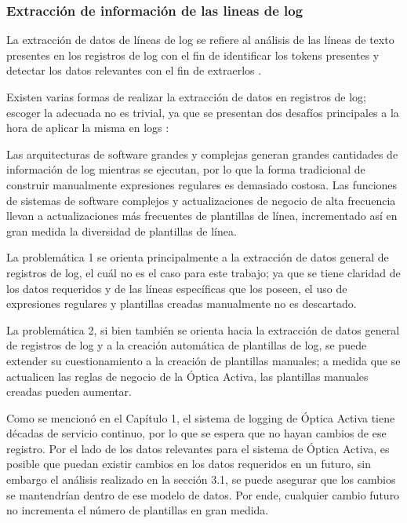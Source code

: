 \begin{enumerate}
\subsubsection{Extracción de información de las lineas de log}

La extracción de datos de líneas de log se refiere al análisis de las líneas de texto presentes en los registros de log con el fin de identificar los tokens presentes y detectar los datos relevantes con el fin de extraerlos \cite{jayathilake2011mind}. 

Existen varias formas de realizar la extracción de datos en registros de log; escoger la adecuada no es trivial, ya que se presentan dos desafíos principales a la hora de aplicar la misma en logs \cite{jayathilake2011mind}:

Las arquitecturas de software grandes y complejas generan grandes cantidades de información de log mientras se ejecutan, por lo que la forma tradicional de construir manualmente expresiones regulares es demasiado costosa.
Las funciones de sistemas de software complejos y actualizaciones de negocio de alta frecuencia llevan a actualizaciones más frecuentes de plantillas de línea, incrementado así en gran medida la diversidad de plantillas de línea.

La problemática 1 se orienta principalmente a la extracción de datos general de registros de log, el cuál no es el caso para este trabajo; ya que se tiene claridad de los datos requeridos y de las líneas específicas que los poseen, el uso de expresiones regulares y plantillas creadas manualmente no es descartado.

La problemática 2, si bien también se orienta hacia la extracción de datos general de registros de log y a la creación automática de plantillas de log, se puede extender su cuestionamiento a la creación de plantillas manuales; a medida que se actualicen las reglas de negocio de la Óptica Activa, las plantillas manuales creadas pueden aumentar.

Como se mencionó en el Capítulo 1, el sistema de logging de Óptica Activa tiene décadas de servicio continuo, por lo que se espera que no hayan cambios de ese registro. Por el lado de los datos relevantes para el sistema de Óptica Activa, es posible que puedan existir cambios en los datos requeridos en un futuro, sin embargo el análisis realizado en la sección 3.1, se puede asegurar que los cambios se mantendrían dentro de ese modelo de datos. Por ende, cualquier cambio futuro no incrementa el número de plantillas en gran medida.


\end{enumerate}
